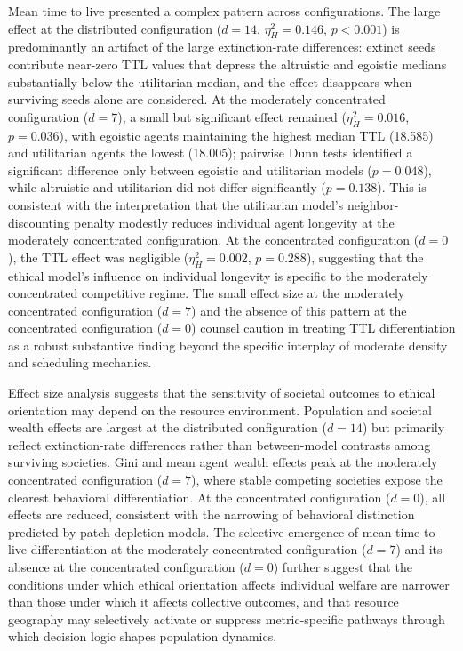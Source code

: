 \documentclass{icsthesis}
\begin{document}
\begin{mainmatter}
Mean time to live presented a complex pattern across configurations. The large effect at the distributed configuration ($d = 14$, $\eta^2_H = 0.146$, $p < 0.001$) is predominantly an artifact of the large extinction-rate differences: extinct seeds contribute near-zero TTL values that depress the altruistic and egoistic medians substantially below the utilitarian median, and the effect disappears when surviving seeds alone are considered. At the moderately concentrated configuration ($d = 7$), a small but significant effect remained ($\eta^2_H = 0.016$, $p = 0.036$), with egoistic agents maintaining the highest median TTL (18.585) and utilitarian agents the lowest (18.005); pairwise Dunn tests identified a significant difference only between egoistic and utilitarian models ($p = 0.048$), while altruistic and utilitarian did not differ significantly ($p = 0.138$). This is consistent with the interpretation that the utilitarian model's neighbor-discounting penalty modestly reduces individual agent longevity at the moderately concentrated configuration. At the concentrated configuration ($d = 0$), the TTL effect was negligible ($\eta^2_H = 0.002$, $p = 0.288$), suggesting that the ethical model's influence on individual longevity is specific to the moderately concentrated competitive regime. The small effect size at the moderately concentrated configuration ($d = 7$) and the absence of this pattern at the concentrated configuration ($d = 0$) counsel caution in treating TTL differentiation as a robust substantive finding beyond the specific interplay of moderate density and scheduling mechanics.

Effect size analysis suggests that the sensitivity of societal outcomes to ethical orientation may depend on the resource environment. Population and societal wealth effects are largest at the distributed configuration ($d = 14$) but primarily reflect extinction-rate differences rather than between-model contrasts among surviving societies. Gini and mean agent wealth effects peak at the moderately concentrated configuration ($d = 7$), where stable competing societies expose the clearest behavioral differentiation. At the concentrated configuration ($d = 0$), all effects are reduced, consistent with the narrowing of behavioral distinction predicted by patch-depletion models. The selective emergence of mean time to live differentiation at the moderately concentrated configuration ($d = 7$) and its absence at the concentrated configuration ($d = 0$) further suggest that the conditions under which ethical orientation affects individual welfare are narrower than those under which it affects collective outcomes, and that resource geography may selectively activate or suppress metric-specific pathways through which decision logic shapes population dynamics.


\end{mainmatter}
\end{document}

